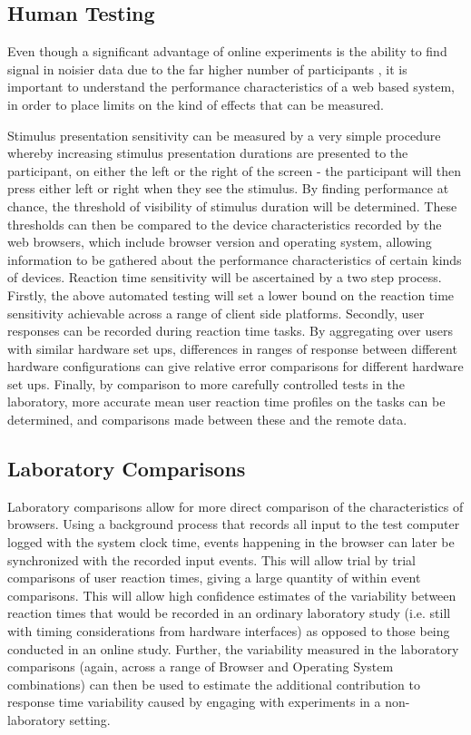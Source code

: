 \documentclass[12pt,a4paper,titlepage]{scrreprt}
\begin{document}
\subsection{Human Testing}
Even though a significant advantage of online experiments is the ability to find signal in noisier data due to the far higher number of participants \parencite{birnbaum_web-based_2001}, it is important to understand the performance characteristics of a web based system, in order to place limits on the kind of effects that can be measured. 

Stimulus presentation sensitivity can be measured by a very simple procedure whereby increasing stimulus presentation durations are presented to the participant, on either the left or the right of the screen - the participant will then press either left or right when they see the stimulus. By finding performance at chance, the threshold of visibility of stimulus duration will be determined. These thresholds can then be compared to the device characteristics recorded by the web browsers, which include browser version and operating system, allowing information to be gathered about the performance characteristics of certain kinds of devices.
Reaction time sensitivity will be ascertained by a two step process. Firstly, the above automated testing will set a lower bound on the reaction time sensitivity achievable across a range of client side platforms. Secondly, user responses can be recorded during reaction time tasks. By aggregating over users with similar hardware set ups, differences in ranges of response between different hardware configurations can give relative error comparisons for different hardware set ups. Finally, by comparison to more carefully controlled tests in the laboratory, more accurate mean user reaction time profiles on the tasks can be determined, and comparisons made between these and the remote data.
\subsection{Laboratory Comparisons}
Laboratory comparisons allow for more direct comparison of the characteristics of browsers. Using a background process that records all input to the test computer logged with the system clock time, events happening in the browser can later be synchronized with the recorded input events. This will allow trial by trial comparisons of user reaction times, giving a large quantity of within event comparisons. This will allow high confidence estimates of the variability between reaction times that would be recorded in an ordinary laboratory study (i.e. still with timing considerations from hardware interfaces) as opposed to those being conducted in an online study. Further, the variability measured in the laboratory comparisons (again, across a range of Browser and Operating System combinations) can then be used to estimate the additional contribution to response time variability caused by engaging with experiments in a non-laboratory setting.
\end{document}
